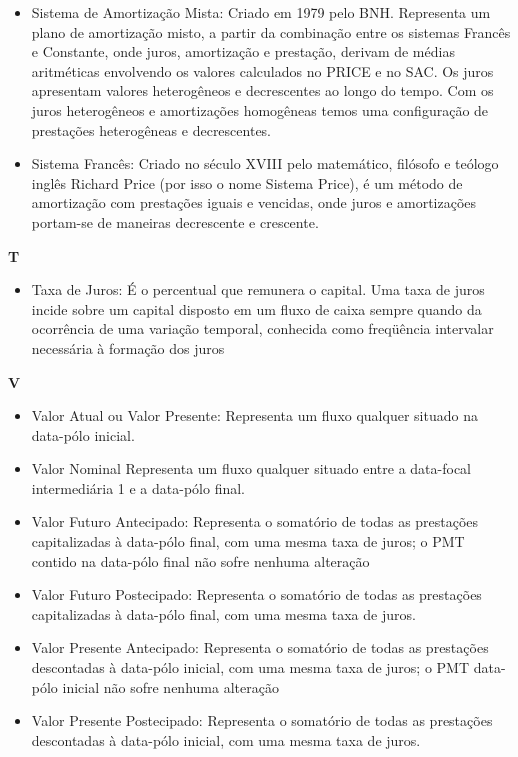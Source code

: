 \begin{itemize}
\item Sistema de Amortização Mista:
    Criado em 1979 pelo BNH. Representa um plano de amortização misto, a partir da combinação entre os sistemas Francês e Constante, onde juros, amortização e prestação, derivam de médias aritméticas envolvendo os valores calculados no PRICE e no SAC. Os juros apresentam valores heterogêneos e decrescentes ao longo do tempo. Com os juros heterogêneos e amortizações homogêneas temos uma configuração de prestações heterogêneas e decrescentes. 

\item Sistema Francês:
    Criado no século XVIII pelo matemático, filósofo e teólogo inglês Richard Price (por isso o nome Sistema Price), é um método de amortização com prestações iguais e vencidas, onde juros e amortizações portam-se de maneiras decrescente e crescente. 
\end{itemize}

\textbf{T}
\begin{itemize}
\item Taxa de Juros:
    É o percentual que remunera o capital. Uma taxa de juros incide sobre um capital disposto em um fluxo de caixa sempre quando da ocorrência de uma variação temporal, conhecida como freqüência intervalar necessária à formação dos juros 
\end{itemize}

\textbf{V}
\begin{itemize}
 \item Valor Atual ou Valor Presente:
    Representa um fluxo qualquer situado na data-pólo inicial. 

\item Valor Nominal
    Representa um fluxo qualquer situado entre a data-focal intermediária 1 e a data-pólo final. 

\item Valor Futuro Antecipado:
    Representa o somatório de todas as prestações capitalizadas à data-pólo final, com uma mesma taxa de juros; o PMT contido na data-pólo final não sofre nenhuma alteração 

\item Valor Futuro Postecipado:
    Representa o somatório de todas as prestações capitalizadas à data-pólo final, 
com uma mesma taxa de juros.

\item Valor Presente Antecipado:
    Representa o somatório de todas as prestações descontadas à data-pólo inicial, com uma mesma taxa de juros; o PMT data-pólo inicial não sofre nenhuma alteração 

\item Valor Presente Postecipado:
    Representa o somatório de todas as prestações descontadas à data-pólo inicial, com uma mesma taxa de juros. 
\end{itemize}



